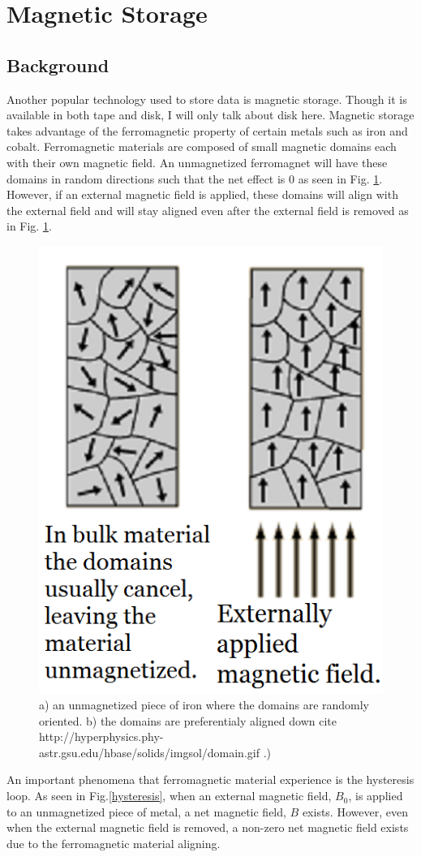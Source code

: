 \documentclass[ notitlepage, numerical, 11pt]{revtex4-1} %
\begin{document}
\section{Magnetic Storage}
\subsection{Background}
Another popular technology used to store data is magnetic storage. Though it is available in both tape and disk, I will only talk about disk here. Magnetic storage takes advantage of the ferromagnetic property of certain metals such as iron and cobalt. Ferromagnetic materials are composed of small magnetic domains each with their own magnetic field. An unmagnetized ferromagnet will have these domains in random directions such that the net effect is 0 as seen in Fig. \ref{domain}. However, if an external magnetic field is applied, these domains will align with the external field and will stay aligned even after the external field is removed as in Fig. \ref{domain}.

\begin{figure}[H]
\centerline{\includegraphics[scale=.5]{domains.png}}
\caption{a) an unmagnetized piece of iron where the domains are randomly oriented. b) the domains are preferentialy aligned down cite http://hyperphysics.phy-astr.gsu.edu/hbase/solids/imgsol/domain.gif \cite{modernPhysics}.)}
\label{domain}
\end{figure} 
An important phenomena that ferromagnetic material experience is the hysteresis loop. As seen in Fig.\ref{hysteresis}, when an external magnetic field, $B_0$, is applied to an unmagnetized piece of metal, a net magnetic field, $B$ exists. However, even when the external magnetic field is removed, a non-zero net magnetic field exists due to the ferromagnetic material aligning.
\end{document}
